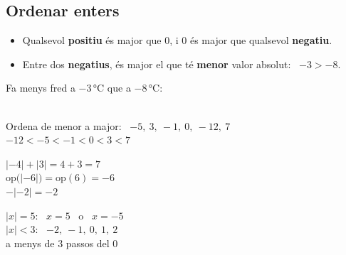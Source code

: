 \documentclass[11pt,a4paper]{article}
\newcommand{\comic}{\fontfamily{ComicNeue-TLF}\selectfont}
\newcommand{\nota}[1]{{\comic\small\color{fmex!85!black}#1}}
\newcommand{\recta}[2]{\draw[-{Latex[length=2.5mm]},fmnavy,line width=1.1pt] (#1-0.6,0) -- (#2+0.6,0);
  \foreach \k in {#1,...,#2} {\draw[fmnavy,line width=0.9pt] (\k,-0.12) -- (\k,0.12); \node[below=3pt,font=\small] at (\k,0) {$\k$};}}
\begin{document}
\vfill
\subsection{Ordenar enters}
\begin{minipage}[t]{0.52\linewidth}
\begin{idea}
\begin{itemize}[leftmargin=1em]
\item Qualsevol \textbf{positiu} és major que 0, i 0 és major que qualsevol \textbf{negatiu}.
\item Entre dos \textbf{negatius}, és major el que té \textbf{menor} valor absolut: \ $-3>-8$.
\end{itemize}
\end{idea}
\end{minipage}\hfill
\begin{minipage}[t]{0.45\linewidth}
\begin{truc}
Fa menys fred a $-3$\,°C que a $-8$\,°C:\\[3pt]
\hspace*{1em}{\Large$-3>-8$} \ \ {\color{fmA}\Large\faThermometerQuarter}
\end{truc}
\end{minipage}

\vfill
\begin{exemple}[Exemples]
\begin{minipage}[t]{0.5\linewidth}
Ordena de menor a major: \ $-5,\ 3,\ -1,\ 0,\ -12,\ 7$\\[4pt]
{\large$-12<-5<-1<0<3<7$}
\end{minipage}\hfill
\begin{minipage}[t]{0.47\linewidth}
$|-4|+|3|=4+3=7$\\[3pt]
$\text{op}\big(|-6|\big)=\text{op}(6)=-6$\\[3pt]
$-|-2|=-2$
\end{minipage}
\end{exemple}

\vfill
\begin{exemple}[Exemple: \ quins enters compleixen \ $|x|=5$? \ I \ $|x|<3$?]
\begin{minipage}[c]{0.38\linewidth}
$|x|=5$: \ $\boxed{x=5}$ \ o \ $\boxed{x=-5}$\\[6pt]
$|x|<3$: \ $\boxed{-2,\ -1,\ 0,\ 1,\ 2}$\\[3pt]
\nota{a menys de 3 passos del 0}
\end{minipage}\hfill
\begin{minipage}[c]{0.6\linewidth}\centering
{}
\end{minipage}
\end{exemple}
\end{document}
